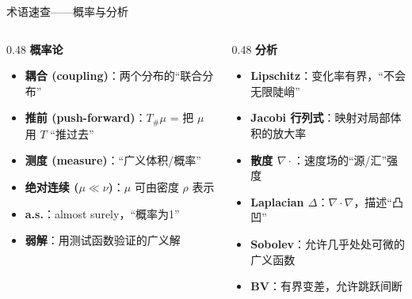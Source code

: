 \documentclass[aspectratio=169,10pt]{beamer}
\begin{document}
\begin{frame}{术语速查——概率与分析}
  \begin{columns}[T]
    \begin{column}{0.48\textwidth}
      \textbf{概率论}
      \begin{itemize}\small
        \item \textbf{耦合 (coupling)}：两个分布的``联合分布''
        \item \textbf{推前 (push-forward)}：$T_{\#}\mu$ = 把 $\mu$ 用 $T$ ``推过去''
        \item \textbf{测度 (measure)}：``广义体积/概率''
        \item \textbf{绝对连续 ($\mu\ll\nu$)}：$\mu$ 可由密度 $\rho$ 表示
        \item \textbf{a.s.}：almost surely，``概率为1''
        \item \textbf{弱解}：用测试函数验证的广义解
      \end{itemize}
    \end{column}
    \begin{column}{0.48\textwidth}
      \textbf{分析}
      \begin{itemize}\small
        \item \textbf{Lipschitz}：变化率有界，``不会无限陡峭''
        \item \textbf{Jacobi 行列式}：映射对局部体积的放大率
        \item \textbf{散度 $\nabla\cdot$}：速度场的``源/汇''强度
        \item \textbf{Laplacian $\Delta$}：$\nabla\cdot\nabla$，描述``凸凹''
        \item \textbf{Sobolev}：允许几乎处处可微的广义函数
        \item \textbf{BV}：有界变差，允许跳跃间断
      \end{itemize}
    \end{column}
  \end{columns}
\end{frame}
\end{document}
